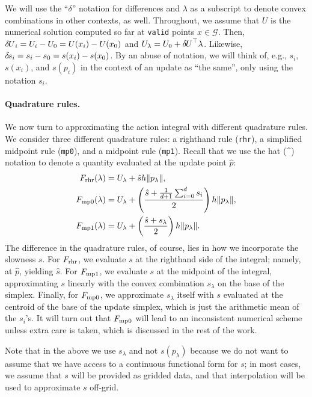 \documentclass[smallcondensed]{svjour3}
\begin{document}
We will use the ``$\delta$'' notation for differences and $\lambda$ as
a subscript to denote convex combinations in other contexts, as
well. Throughout, we assume that $U$ is the numerical solution
computed so far at \texttt{valid} points $x \in \mathcal{G}$. Then,
${\delta \hspace{-0.09em} U}_i = U_i - U_0 = U(x_i) - U(x_0)$ and
$U_\lambda = U_0 + {\delta \hspace{-0.09em} U}^\top \lambda$. Likewise,
${\delta \hspace{-0.1em} s}_i = s_i - s_0 = s(x_i) - s(x_0)$. By an abuse of notation, we
will think of, e.g., $s_i$, $s(x_i)$, and $s(p_i)$ in the context of
an update as ``the same'', only using the notation $s_i$.

\paragraph{Quadrature rules.} We now turn to approximating the action
integral with different quadrature rules. We consider three different
quadrature rules: a righthand rule (\texttt{rhr}), a simplified
midpoint rule (\texttt{mp0}), and a midpoint rule
(\texttt{mp1}). Recall that we use the hat (\^{}) notation to denote a
quantity evaluated at the update point $\hat{p}$:
\begin{align}
  F_{\operatorname{rhr}}(\lambda) &= U_\lambda + \hat{s} h \|p_\lambda\|, \\
  F_{\operatorname{mp0}}(\lambda) &= U_\lambda + \left(\frac{\hat{s} + \tfrac{1}{d+1} \sum_{i=0}^d s_i}{2}\right) h \|p_\lambda\|, \\
  F_{\operatorname{mp1}}(\lambda) &= U_\lambda + \left(\frac{\hat{s} + s_\lambda}{2}\right) h \|p_\lambda\|.
\end{align}
The difference in the quadrature rules, of course, lies in how we
incorporate the slowness $s$. For $F_{\operatorname{rhr}}$, we evaluate $s$ at the
righthand side of the integral; namely, at $\hat{p}$, yielding
$\hat{s}$. For $F_{\operatorname{mp1}}$, we evaluate $s$ at the midpoint of the
integral, approximating $s$ linearly with the convex combination
$s_\lambda$ on the base of the simplex. Finally, for $F_{\operatorname{mp0}}$, we
approximate $s_\lambda$ itself with $s$ evaluated at the centroid of
the base of the update simplex, which is just the arithmetic mean of
the $s_i$'s. It will turn out that $F_{\operatorname{mp0}}$ will lead to an
inconsistent numerical scheme unless extra care is taken, which is
discussed in the rest of the work.

Note that in the above we use $s_\lambda$ and not $s(p_\lambda)$
because we do not want to assume that we have access to a continuous
functional form for $s$; in most cases, we assume that $s$ will be
provided as gridded data, and that interpolation will be used to
approximate $s$ off-grid.
\end{document}
